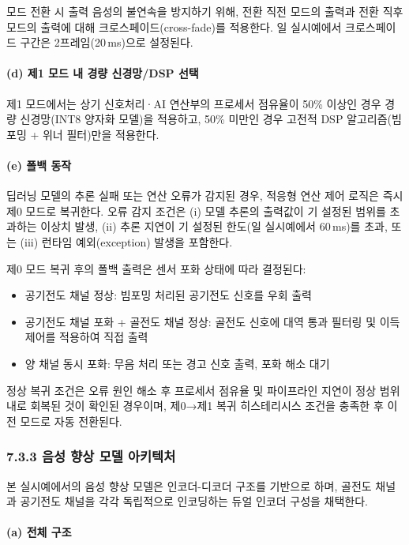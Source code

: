 \documentclass{article}
\begin{document}
모드 전환 시 출력 음성의 불연속을 방지하기 위해, 전환 직전 모드의 출력과 전환 직후 모드의 출력에 대해 크로스페이드(cross-fade)를 적용한다. 일 실시예에서 크로스페이드 구간은 2프레임(20\,ms)으로 설정된다.

\paragraph{(d) 제1 모드 내 경량 신경망/DSP 선택}

제1 모드에서는 상기 신호처리·AI 연산부의 프로세서 점유율이 50\% 이상인 경우 경량 신경망(INT8 양자화 모델)을 적용하고, 50\% 미만인 경우 고전적 DSP 알고리즘(빔포밍 + 위너 필터)만을 적용한다.

\paragraph{(e) 폴백 동작}

딥러닝 모델의 추론 실패 또는 연산 오류가 감지된 경우, 적응형 연산 제어 로직은 즉시 제0 모드로 복귀한다. 오류 감지 조건은 (i) 모델 추론의 출력값이 기 설정된 범위를 초과하는 이상치 발생, (ii) 추론 지연이 기 설정된 한도(일 실시예에서 60\,ms)를 초과, 또는 (iii) 런타임 예외(exception) 발생을 포함한다.

제0 모드 복귀 후의 폴백 출력은 센서 포화 상태에 따라 결정된다:
\begin{itemize}
    \item 공기전도 채널 정상: 빔포밍 처리된 공기전도 신호를 우회 출력
    \item 공기전도 채널 포화 + 골전도 채널 정상: 골전도 신호에 대역 통과 필터링 및 이득 제어를 적용하여 직접 출력
    \item 양 채널 동시 포화: 무음 처리 또는 경고 신호 출력, 포화 해소 대기
\end{itemize}

정상 복귀 조건은 오류 원인 해소 후 프로세서 점유율 및 파이프라인 지연이 정상 범위 내로 회복된 것이 확인된 경우이며, 제0→제1 복귀 히스테리시스 조건을 충족한 후 이전 모드로 자동 전환된다.

\subsubsection{7.3.3 음성 향상 모델 아키텍처}

본 실시예에서의 음성 향상 모델은 인코더-디코더 구조를 기반으로 하며, 골전도 채널과 공기전도 채널을 각각 독립적으로 인코딩하는 듀얼 인코더 구성을 채택한다.

\paragraph{(a) 전체 구조}
\end{document}
